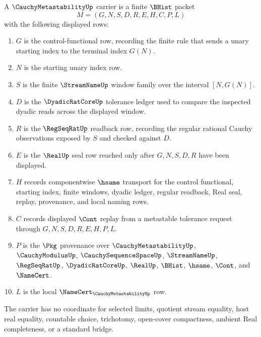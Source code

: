 \begin{definition}
\label{def:cauchy-metastability-carrier}
A $\CauchyMetastabilityUp$ carrier is a finite $\BHist$ packet
$$
M=(G,N,S,D,R,E,H,C,P,L)
$$
with the following displayed rows:
\begin{enumerate}
\item $G$ is the control-functional row, recording the finite rule that sends a unary starting index to the terminal index $G(N)$.
\item $N$ is the starting unary index row.
\item $S$ is the finite $\StreamNameUp$ window family over the interval $[N,G(N)]$.
\item $D$ is the $\DyadicRatCoreUp$ tolerance ledger used to compare the inspected dyadic reads across the displayed window.
\item $R$ is the $\RegSeqRatUp$ readback row, recording the regular rational Cauchy observations exposed by $S$ and checked against $D$.
\item $E$ is the $\RealUp$ seal row reached only after $G,N,S,D,R$ have been displayed.
\item $H$ records componentwise $\hsame$ transport for the control functional, starting index, finite windows, dyadic ledger, regular readback, Real seal, replay, provenance, and local naming rows.
\item $C$ records displayed $\Cont$ replay from a metastable tolerance request through $G,N,S,D,R,E,H,P,L$.
\item $P$ is the $\Pkg$ provenance over $\CauchyMetastabilityUp$, $\CauchyModulusUp$, $\CauchySequenceSpaceUp$, $\StreamNameUp$, $\RegSeqRatUp$, $\DyadicRatCoreUp$, $\RealUp$, $\BHist$, $\hsame$, $\Cont$, and $\NameCert$.
\item $L$ is the local $\NameCert_{\CauchyMetastabilityUp}$ row.
\end{enumerate}
The carrier has no coordinate for selected limits, quotient stream equality, host real equality, countable choice, trichotomy, open-cover compactness, ambient Real completeness, or a standard bridge.
\end{definition}

